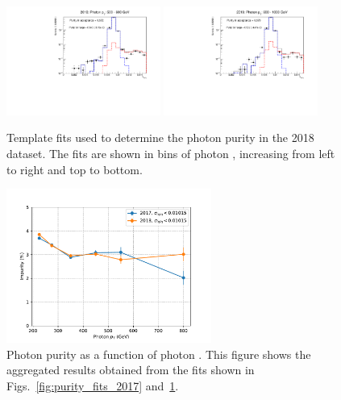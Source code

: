 \begin{figure}[htbp]
    \includegraphics[width=0.45\textwidth]{fig/purity/fit_2018_pt500-600.pdf}
    \includegraphics[width=0.45\textwidth]{fig/purity/fit_2018_pt600-1000.pdf}
    \caption{Template fits used to determine the photon purity in the 2018 dataset. The fits are shown in bins of photon \pt, increasing from left to right and top to bottom. }
    \label{fig:purity_fits_2018}
  \end{figure}

\begin{figure}[htbp]
    \centering
    \includegraphics[width=0.6\textwidth]{fig/purity/purity.pdf}
    \caption{Photon purity as a function of photon \pt. This figure shows the aggregated results obtained from the fits shown in Figs.~\ref{fig:purity_fits_2017} and~\ref{fig:purity_fits_2018}.}
    \label{fig:purity_result}
  \end{figure}
